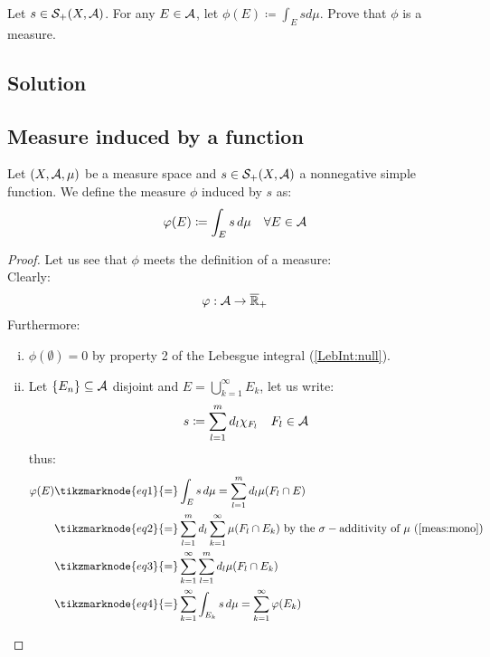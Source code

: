 

\question

Let $s \in \mathcal{S}_+(X, \mathcal{A})$. For any $E \in \mathcal{A}$, let $\phi(E) \coloneqq \int_E s d\mu$. Prove that $\phi$ is a measure.

\subsection*{Solution}

\subsection{Measure induced by a function}
Let $(X,\mathcal{A},\mu)$ be a measure space and $s\in\mathcal{S}_+(X,\mathcal{A})$ a nonnegative simple function. We define the measure $\phi$ induced by $s$ as:
\[
    \varphi(E) \coloneqq \int_E s\,d\mu \quad \forall E\in \mathcal{A}
\]

\begin{proof}
    Let us see that $\phi$ meets the definition of a measure:\\
    Clearly:
    \[
        \varphi : \mathcal{A} \to \overline{\mathbb{R}}_{+}    
    \]
    Furthermore:
    \begin{enumerate}[i)]
        \item $\phi(\emptyset) = 0$ by property 2 of the Lebesgue integral (\ref{LebInt:null}).
        \item Let $\{ E_n \}\subseteq\mathcal{A}$ disjoint and $E=\bigcup_{k=1}^\infty E_k$, let us write:
            \[
                s \coloneqq \sum_{l=1}^m d_l \chi_{F_l} \quad F_l \in \mathcal{A}    
            \]
            thus:
            \begin{align*}
                \phi(E) &\tikzmarknode{eq1}{=} \int_E s\,d\mu = \sum_{l=1}^m d_l \mu(F_l\cap E) \\
                &\tikzmarknode{eq2}{=} \sum_{l=1}^m d_l \sum_{k=1}^\infty \mu(F_l\cap E_k) \text{ by the $\s{additivity}$ of $\mu$ (\ref{meas:mono})}\\
                &\tikzmarknode{eq3}{=} \sum_{k=1}^\infty \sum_{l=1}^m d_l \mu(F_l\cap E_k) \\
                &\tikzmarknode{eq4}{=} \sum_{k=1}^\infty \int_{E_k} s \, d\mu = \sum_{k=1}^\infty \phi(E_k)
            \end{align*} 
    \end{enumerate}
\end{proof}
